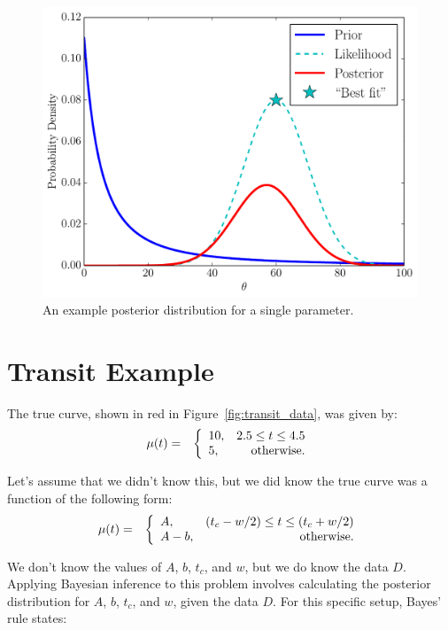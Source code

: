 \begin{figure}
\begin{center}
\includegraphics[scale=0.5]{bayes.pdf}
\caption{An example posterior distribution for a single parameter.
\label{fig:bayes}}
\end{center}
\end{figure}

\section{Transit Example}

The true curve, shown in red in Figure~\ref{fig:transit_data}, was given by:
\begin{eqnarray*}
\mu(t) &=& \left\{
\begin{array}{lr}
10, & 2.5 \leq t \leq 4.5\\
5,  & \textnormal{otherwise}.
\end{array}
\right.
\end{eqnarray*}

Let's assume that we didn't know this, but we did know the true curve
was a function of the following form:
\begin{eqnarray*}
\mu(t) &=& \left\{
\begin{array}{lr}
A, & (t_c - w/2) \leq t \leq (t_c + w/2)\\
A-b,  & \textnormal{otherwise}.
\end{array}
\right.
\end{eqnarray*}

We don't know the values of $A$, $b$, $t_c$, and $w$,
but we do know the data $D$. Applying Bayesian inference to this problem
involves calculating the posterior distribution for $A$, $b$, $t_c$, and $w$,
given the data $D$. For this specific setup, Bayes' rule states:

